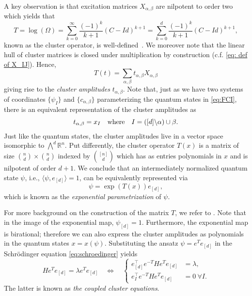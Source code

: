 \documentclass[11pt,reqno]{amsart}
\theoremstyle{definition}
\numberwithin{theorem}{section}
\numberwithin{equation}{section}
\begin{document}
\noindent A key observation is that excitation matrices $X_{\alpha, \beta}$ are nilpotent to order two which yields that 
\begin{equation*}
T 
= \log(\Omega)
= \sum_{k=0}^\infty \frac{(-1)^k}{k+1} (C-Id)^{k+1} 
= \sum_{k=0}^d \frac{(-1)^k}{k+1} (C-Id)^{k+1},
\end{equation*}
known as the cluster operator, is well-defined~\cite{faulstich2024coupled}. We moreover note that the linear hull of cluster matrices is closed under multiplication by construction (c.f. \eqref{eq: def of X_IJ}). Hence, 
\begin{equation*}
T(t)
= \sum_{\alpha, \beta} t_{\alpha,\beta} X_{\alpha, \beta}
\end{equation*}
giving rise to the \emph{cluster amplitudes} $t_{\alpha,\beta}$. Note that, just as we have two systems of coordinates $\{\psi_I\}$ and $\{c_{\alpha, \beta}\}$ parameterizing the quantum states in \eqref{eq:FCI}, there is an equivalent representation of the cluster amplitudes as 
\begin{equation*}
 t_{\alpha,\beta} = x_I
 \quad {\rm where} \quad 
 I = ([d] \backslash \alpha) \cup \beta. 
\end{equation*}
Just like the quantum states, the cluster amplitudes live in a vector space isomorphic to $\bigwedge^d \mathbb R^n$.
Put differently, the cluster operator $T(x)$ is a matrix of size ${n \choose d} \times {n \choose d}$ indexed by ${[n] \choose d}$ which has as entries polynomials in $x$ and is nilpotent of order $d+1$. We conclude that an intermediately normalized quantum state $\psi$, i.e., $\langle \psi ,e_{[d]} \rangle = 1$, can be equivalently represented via 
\begin{equation}\label{eq: exponential parametrization}
  \psi = \exp(T(x))e_{[d]},
\end{equation}
which is known as the \emph{exponential parametrization} of $\psi$.

For more background on the construction of the matrix $T$, we refer to \cite{faulstich2024algebraic}. Note that in the image of the exponential map,  $\psi_{[d]}=1$. Furthermore, the exponential map is birational; therefore we can also express the cluster amplitudes as polynomials in the quantum states $x = x(\psi)$. Substituting the ansatz $\psi=e^{T} e_{[d]}$ in the Schrödinger equation \eqref{eq:schroedinger} yields 
\begin{equation*}
H e^{T} e_{[d]} = \lambda e^{T} e_{[d]}
\quad \Leftrightarrow \quad 
\left\lbrace 
\begin{aligned}
e_{[d]}^\top e^{-T} H e^{T} e_{[d]} &= \lambda, \\
e_{I}^\top e^{-T} H e^{T} e_{[d]} &= 0~\forall I.
\end{aligned}
\right.
\end{equation*}
The latter is known as \emph{the coupled cluster equations}. 
\end{document}
